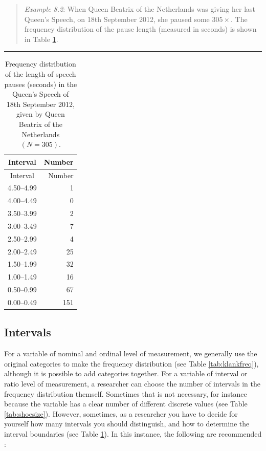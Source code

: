 \documentclass[
]{book}
\begin{document}
\begin{quote}
\emph{Example 8.2}: When Queen Beatrix of the Netherlands was giving her last Queen's Speech,
on 18th September 2012, she paused some \(305\times\). The frequency distribution
of the pause length (measured in seconds) is shown in
Table \ref{tab:queensspeech2012pauses}.
\end{quote}

\begin{center}\rule{0.5\linewidth}{0.5pt}\end{center}

\begin{longtable}[]{@{}cr@{}}
\caption{\label{tab:queensspeech2012pauses} Frequency distribution of the length of speech pauses (seconds)
in the Queen's Speech of 18th September 2012, given by Queen Beatrix of the Netherlands
\((N=305)\).}\tabularnewline
\toprule
Interval & Number \\
\midrule
\endfirsthead
\toprule
Interval & Number \\
\midrule
\endhead
4.50--4.99 & 1 \\
4.00--4.49 & 0 \\
3.50--3.99 & 2 \\
3.00--3.49 & 7 \\
2.50--2.99 & 4 \\
2.00--2.49 & 25 \\
1.50--1.99 & 32 \\
1.00--1.49 & 16 \\
0.50--0.99 & 67 \\
0.00--0.49 & 151 \\
\bottomrule
\end{longtable}

\hypertarget{sec:intervals}{%
\subsection{Intervals}\label{sec:intervals}}

For a variable of nominal and ordinal level of measurement, we generally
use the original categories to make the frequency distribution
(see Table \ref{tab:klankfreq}), although it is possible to add categories
together. For a variable of interval or ratio level of measurement, a
researcher can choose the number of intervals in the frequency distribution
themself. Sometimes that is not necessary, for instance because the variable has
a clear number of different discrete values (see Table \ref{tab:shoesize}).
However, sometimes, as a researcher you have to decide for yourself how many
intervals you should distinguish, and how to determine the
interval boundaries (see Table \ref{tab:queensspeech2012pauses}).
In this instance, the following are recommended \citep[Ch.2]{Ferg89}:
\end{document}
